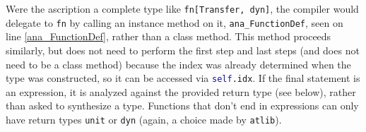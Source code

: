 \documentclass[9pt]{sigplanconf}
\newcommand{\lstinlinep}[1]{\lstinline[language=Python,basicstyle=\ttfamily\small,deletendkeywords={tuple,buffer,map}]{#1}}
\begin{document}
Were the ascription a complete type like \lstinlinep{fn[Transfer, dyn]}, the compiler would delegate to \lstinlinep{fn} by calling an instance method on it, \lstinlinep{ana_FunctionDef}, seen on line \ref{ana_FunctionDef}, rather than a class method. This method proceeds similarly, but does not need to perform the first step and last steps (and does not need to be a class method) because the index was already determined when the type was constructed, so it can be accessed via \lstinlinep{self.idx}. If the final statement is an expression, it is analyzed against the provided return type (see below), rather than asked to synthesize a type. Functions that don't end in expressions can only have return types \lstinlinep{unit} or \lstinlinep{dyn} (again, a choice made by \verb|atlib|).%

\end{document}
